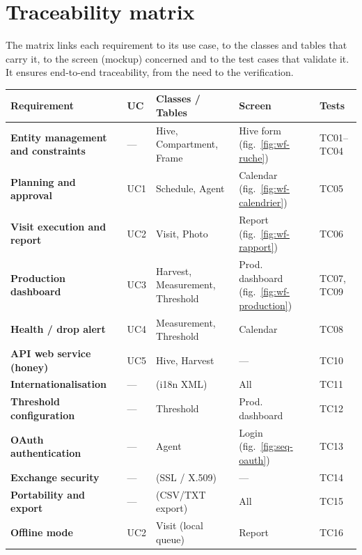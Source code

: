 \section{Traceability matrix}
The matrix links each requirement to its use case, to the classes and tables
that carry it, to the screen (mockup) concerned and to the test cases that
validate it. It ensures end-to-end traceability, from the need to the
verification.
{\small
\begin{xltabular}{\textwidth}{>{\bfseries}X C{1.3cm} p{3.3cm} p{2.5cm} p{2.6cm}}
\toprule
\textbf{Requirement} & \textbf{UC} & \textbf{Classes / Tables} & \textbf{Screen} & \textbf{Tests} \\
\midrule
\endhead
Entity management and constraints & --- & Hive, Compartment, Frame & Hive form (fig.~\ref{fig:wf-ruche}) & TC01--TC04 \\
Planning and approval & UC1 & Schedule, Agent & Calendar (fig.~\ref{fig:wf-calendrier}) & TC05 \\
Visit execution and report & UC2 & Visit, Photo & Report (fig.~\ref{fig:wf-rapport}) & TC06 \\
Production dashboard & UC3 & Harvest, Measurement, Threshold & Prod. dashboard (fig.~\ref{fig:wf-production}) & TC07, TC09 \\
Health / drop alert & UC4 & Measurement, Threshold & Calendar & TC08 \\
API web service (honey) & UC5 & Hive, Harvest & --- & TC10 \\
Internationalisation & --- & (i18n XML) & All & TC11 \\
Threshold configuration & --- & Threshold & Prod. dashboard & TC12 \\
OAuth authentication & --- & Agent & Login (fig.~\ref{fig:seq-oauth}) & TC13 \\
Exchange security & --- & (SSL / X.509) & --- & TC14 \\
Portability and export & --- & (CSV/TXT export) & All & TC15 \\
Offline mode & UC2 & Visit (local queue) & Report & TC16 \\
\bottomrule
\end{xltabular}}
